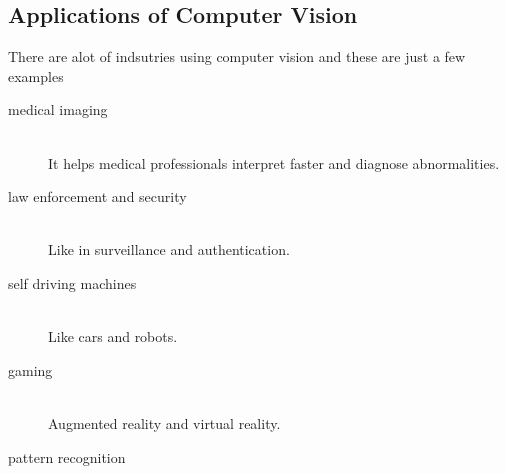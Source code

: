     \subsection{Applications of Computer Vision}
        There are alot of indsutries using computer vision and these are just a few examples  ~\cite{mldlcv}
        \begin{description}
        \item[medical imaging] \hfill \\ 
            It helps medical professionals interpret faster and diagnose abnormalities.
        \item[law enforcement and security] \hfill \\
            Like in surveillance and authentication.
        \item[self driving machines] \hfill \\ Like cars and robots.
        \item[gaming] \hfill \\ Augmented reality and virtual reality.
        \item[pattern recognition] \hfill \\
        \end{description}

